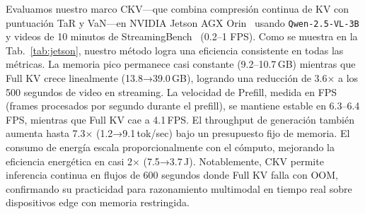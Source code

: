 Evaluamos nuestro marco CKV---que combina compresión continua de KV con puntuación TaR y VaN---en NVIDIA Jetson AGX Orin~\cite{Karumbunathan2022JetsonAGXOrin} usando \texttt{Qwen-2.5-VL-3B} y videos de 10 minutos de StreamingBench~\cite{lin2024streaming} (0.2--1 FPS). Como se muestra en la Tab.~\ref{tab:jetson}, nuestro método logra una eficiencia consistente en todas las métricas. La memoria pico permanece casi constante (9.2--10.7\,GB) mientras que Full KV crece linealmente (13.8→39.0\,GB), logrando una reducción de 3.6$\times$ a los 500 segundos de video en streaming. La velocidad de Prefill, medida en FPS (frames procesados por segundo durante el prefill), se mantiene estable en 6.3--6.4\,FPS, mientras que Full KV cae a 4.1\,FPS. El throughput de generación también aumenta hasta 7.3$\times$ (1.2→9.1\,tok/sec) bajo un presupuesto fijo de memoria. El consumo de energía escala proporcionalmente con el cómputo, mejorando la eficiencia energética en casi 2$\times$ (7.5→3.7\,J). Notablemente, CKV permite inferencia continua en flujos de 600 segundos donde Full KV falla con OOM, confirmando su practicidad para razonamiento multimodal en tiempo real sobre dispositivos edge con memoria restringida.
